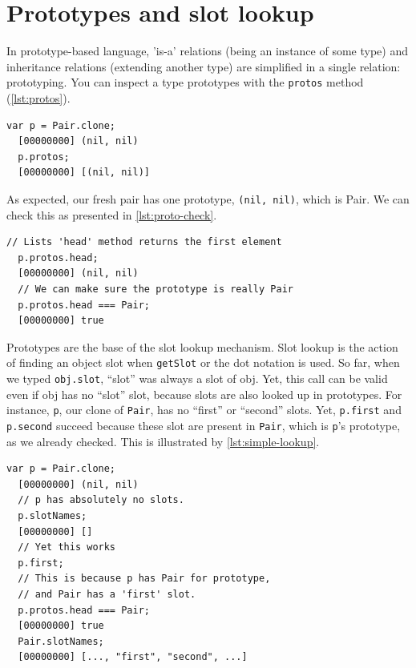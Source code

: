 \documentclass[openright,twoside,12pt]{report}
\newcommand{\lst}[1]{\autoref{lst:#1}}
\begin{document}
\section{Prototypes and slot lookup}

In prototype-based language, 'is-a' relations (being an instance of
some type) and inheritance relations (extending another type) are
simplified in a single relation: prototyping. You can inspect a type
prototypes with the \texttt{protos} method (\lst{protos}).

\begin{lstlisting}[caption=Inspecting prototypes, label=lst:protos]
  var p = Pair.clone;
  [00000000] (nil, nil)
  p.protos;
  [00000000] [(nil, nil)]
\end{lstlisting}

As expected, our fresh pair has one prototype, \lstinline|(nil, nil)|,
which is Pair. We can check this as presented in \lst{proto-check}.

\begin{lstlisting}[caption=Checking the prototype, label=lst:proto-check]
  // Lists 'head' method returns the first element
  p.protos.head;
  [00000000] (nil, nil)
  // We can make sure the prototype is really Pair
  p.protos.head === Pair;
  [00000000] true
\end{lstlisting}

Prototypes are the base of the slot lookup mechanism. Slot lookup is
the action of finding an object slot when \texttt{getSlot} or the dot
notation is used. So far, when we typed \lstinline|obj.slot|, ``slot''
was always a slot of obj. Yet, this call can be valid even if obj has
no ``slot'' slot, because slots are also looked up in prototypes. For
instance, \lstinline|p|, our clone of \lstinline|Pair|, has no
``first'' or ``second'' slots. Yet, \lstinline|p.first| and
\lstinline|p.second| succeed because these slot are present in
\lstinline|Pair|, which is \lstinline|p|'s prototype, as we already
checked. This is illustrated by \lst{simple-lookup}.

\begin{lstlisting}[caption=Slot found by lookup, label=lst:simple-lookup]
  var p = Pair.clone;
  [00000000] (nil, nil)
  // p has absolutely no slots.
  p.slotNames;
  [00000000] []
  // Yet this works
  p.first;
  // This is because p has Pair for prototype,
  // and Pair has a 'first' slot.
  p.protos.head === Pair;
  [00000000] true
  Pair.slotNames;
  [00000000] [..., "first", "second", ...]
\end{lstlisting}
\end{document}
